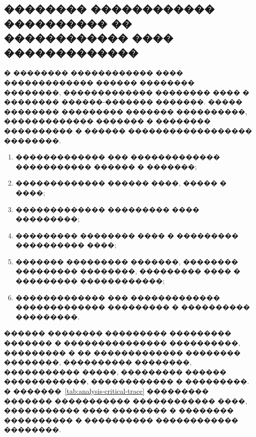 \subsection{�������� ������������ ���������� �� ������������ ���� �������������}

� �������� ������������ ���� ������������� ������ �������� ��������, ������������� �������� ���� � �������� ������-������� �������. ����� �������� ��������� ������� ����������, ������������� ������� � �������� ���������� � ������ ������������������ ��������.
\begin{enumerate}
  \item ������������� ��� ������������� ����������� ������ � �������;
  \item ������������� ������ ����, ����� � ����;
  \item ������������� ��������� ���� ���������;
  \item ��������� �������� ���� � ��������� ���������� ����;
  \item ������� ��������� �������, �������� ��������� ��������, ��������� ���� � ��������� ������������;
  \item ������������� ��� ������������� ������������� ��������� � ���������� ���������.
\end{enumerate}

������ �������� ��������� ��������� ������� � ��������������� ����������, ��������� � �� ������������� �������� ��������, ���������� ��������, ����������� �����, ��������� ������ ������������, ������������ � ���������. � �������~\ref{tab:analysis-critical-trace} ��������� ������� ����������� ������������ ����, ����������� ���� �������� � �������� ���������� � ���������� ������������ ��������.

